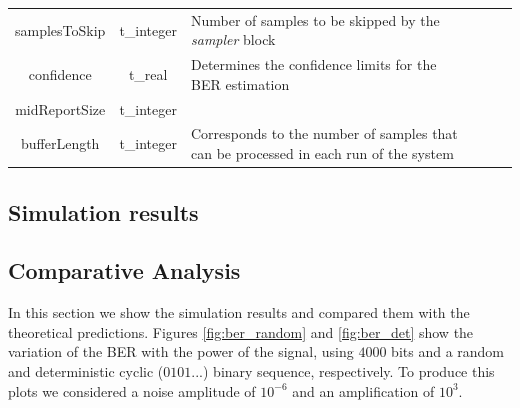 \begin{table}[]
\begin{tabular}{|c|c|p{70mm}|ccp{70mm}}
		samplesToSkip & t\_integer & Number of samples to be skipped by the \textit{sampler} block &    \\ \cline{1-3}
		confidence & t\_real & Determines the confidence limits for the BER estimation &    \\ \cline{1-3}
		midReportSize & t\_integer &  &    \\ \cline{1-3}
		bufferLength & t\_integer & Corresponds to the number of samples that can be processed in each run of the system &    \\ \cline{1-3}
		\end{tabular}
		\label{table:in_par}
		\end{table}

\subsection*{Simulation results}

\subsection{Comparative Analysis}

In this section we show the simulation results and compared them with the theoretical predictions. Figures \ref{fig:ber_random} and \ref{fig:ber_det} show the variation of the BER with the power of the signal, using $4000$ bits and a random and deterministic cyclic ($0101...$) binary sequence, respectively. To produce this plots we considered a noise amplitude of $10^{-6}$ and an amplification of $10^3$. 

